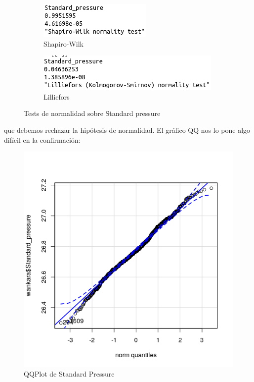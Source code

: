 \begin{figure}[H]
	\centering
	\begin{subfigure}{.5\textwidth}
		\centering
		\includegraphics[width=.7\linewidth]{shapiro-sp.png}
		\caption{Shapiro-Wilk}
		\label{fig:sw-sp}
	\end{subfigure}%
	\begin{subfigure}{.5\textwidth}
		\centering
		\includegraphics[width=.7\linewidth]{lillie-sp.png}	\caption{Lilliefors}
		\label{fig:l-sp}
	\end{subfigure}
	\caption{Tests de normalidad sobre Standard pressure}
	\label{fig:norm-sp}
\end{figure}

que debemos rechazar la hipótesis de normalidad. El gráfico QQ nos lo pone algo difícil en la confirmación:

\begin{figure}[H] %
	\centering
	\includegraphics[scale=0.7]{qq-sp.png}  %
	\caption{QQPlot de Standard Pressure} 
	\label{fig:qq-sp}
\end{figure}

